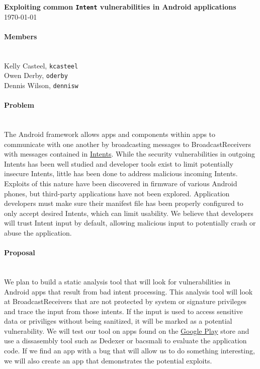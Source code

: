 \documentclass[12pt,a4paper,draft]{article}
\begin{document}


\flushleft\textbf{Exploiting common \texttt{Intent} vulnerabilities in Android %
applications}\\
\today\\

\paragraph{Members} ~\\

Kelly Casteel, \texttt{kcasteel}\\
Owen Derby, \texttt{oderby}\\
Dennis Wilson, \texttt{dennisw}\\

\paragraph{Problem} ~\\
The Android framework allows apps and components within apps to communicate with one another by broadcasting messages to BroadcastReceivers with messages contained in \href{https://developer.android.com/reference/android/content/Intent.html}{Intents}. While the security vulnerabilities in outgoing Intents has been well studied\cite{chin_analayzing_2011} and developer tools exist to limit potentially insecure Intents, little has been done to address malicious incoming Intents. Exploits of this nature have been discovered in firmware of various Android phones\cite{grace_systematic_2012}, but third-party applications have not been explored. Application developers must make sure their manifest file has been properly configured to only accept desired Intents, which can limit usability. We believe that developers will trust Intent input by default, allowing malicious input to potentially crash or abuse the application. 

\paragraph{Proposal} ~\\
We plan to build a static analysis tool that will look for vulnerabilities in
Android apps that result from bad intent processing. This analysis tool will
look at BroadcastReceivers that are not protected by system or signature
privileges and trace the input from those intents. If the input is used to
access sensitive data or priviliges without being sanitized, it will be marked
as a potential vulnerability. We will test our tool on apps found on the
\href{https://play.google.com/store/apps}{Google Play} store and use a dissasembly tool such as Dedexer or bacsmali to evaluate the application code. If we find an app
with a bug that will allow us to do something interesting, we will also create
an app that demonstrates the potential exploits.


\end{document}
